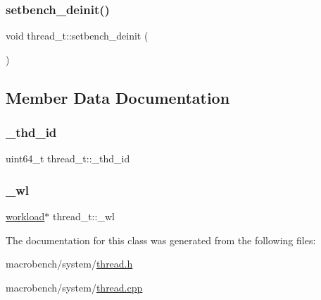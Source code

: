 \mbox{\label{classthread__t_a6f57d164e9a3c1e1623882b14943b34d}} 
\subsubsection{\texorpdfstring{setbench\+\_\+deinit()}{setbench\_deinit()}}
{\footnotesize\ttfamily void thread\+\_\+t\+::setbench\+\_\+deinit (\begin{DoxyParamCaption}{ }\end{DoxyParamCaption})}



\subsection{Member Data Documentation}
\mbox{\label{classthread__t_ab26bbe2a110faa177b70a7ba07a26bcb}} 
\subsubsection{\texorpdfstring{\+\_\+thd\+\_\+id}{\_thd\_id}}
{\footnotesize\ttfamily uint64\+\_\+t thread\+\_\+t\+::\+\_\+thd\+\_\+id}

\mbox{\label{classthread__t_a22b5d80e0ce6ce841d0585b99f6e7de1}} 
\subsubsection{\texorpdfstring{\+\_\+wl}{\_wl}}
{\footnotesize\ttfamily \hyperlink{classworkload}{workload}$\ast$ thread\+\_\+t\+::\+\_\+wl}



The documentation for this class was generated from the following files\+:\begin{DoxyCompactItemize}
\item 
macrobench/system/\hyperlink{thread_8h}{thread.\+h}\item 
macrobench/system/\hyperlink{thread_8cpp}{thread.\+cpp}\end{DoxyCompactItemize}

